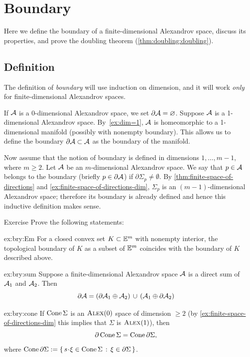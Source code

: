 \chapter{Boundary}\label{chap:bry}

Here we define the boundary of a finite-dimensional Alexandrov space, discuss its properties, and prove the doubling theorem (\ref{thm:doubling:doubling}).

\section{Definition}

The definition of \emph{boundary} will use induction on dimension, and it will work \textit{only} for finite-dimensional Alexandrov spaces.

If $\mathcal{A}$ is a $0$-dimensional Alexandrov space, we set
$\partial\mathcal{A}=\varnothing$.
Suppose $\mathcal{A}$ is a 1-dimensional Alexandrov space.
By~\ref{ex:dim=1},
$\mathcal{A}$ is homeomorphic to a 1-dimensional manifold (possibly with nonempty boundary).
This allows us to define the boundary $\partial\mathcal{A}\subset \mathcal{A}$ as the boundary of the manifold.

Now assume that the notion of boundary is defined in dimensions $1,\dots,m-1$, where $m\ge 2$.
Let $\mathcal{A}$ be an $m$-dimensional Alexandrov space.
We say that $p\in \mathcal{A}$ belongs to the boundary (briefly $p\in \partial \mathcal{A}$) if 
$\partial\Sigma_p\ne\emptyset$.
By \ref{thm:finite-space-of-directions} and \ref{ex:finite-space-of-directions-dim}, $\Sigma_p$ is an $(m-1)$-dimensional Alexandrov space;
therefore its boundary is already defined and hence this inductive definition makes sense.

\begin{thm}{Exercise}\label{ex:bry}
Prove the following statements:

\begin{subthm}{ex:bry:Em}
For a closed convex set $K\subset \mathbb{E}^m$ with nonempty interior, the topological boundary of $K$ as a subset of $\mathbb{E}^m$ coincides with the boundary of $K$ described above.
\end{subthm}

\begin{subthm}{ex:bry:sum}
Suppose a finite-dimensional Alexandrov space $\mathcal{A}$ is a direct sum of $\mathcal{A}_1$ and $\mathcal{A}_2$.
Then
\[\partial \mathcal{A}=(\partial\mathcal{A}_1\oplus\mathcal{A}_2)\,\cup\,(\mathcal{A}_1\oplus\partial\mathcal{A}_2)\]
\end{subthm}

\begin{subthm}{ex:bry:cone}
If $\mathop{\rm Cone}\nolimits\Sigma$ is an $\textup{\textsc{Alex}}(0)$ space of dimension $\ge 2$ (by \ref{ex:finite-space-of-directions-dim} this implies that $\Sigma$ is $\textup{\textsc{Alex}}(1)$), then
\[\partial \mathop{\rm Cone}\nolimits\Sigma=\mathop{\rm Cone}\nolimits\partial\Sigma,\]
where $\Cone\partial\Sigma\df\set{s\cdot \xi\in\Cone\Sigma }{\xi\in \partial\Sigma}$.
\end{subthm}

\end{thm}


